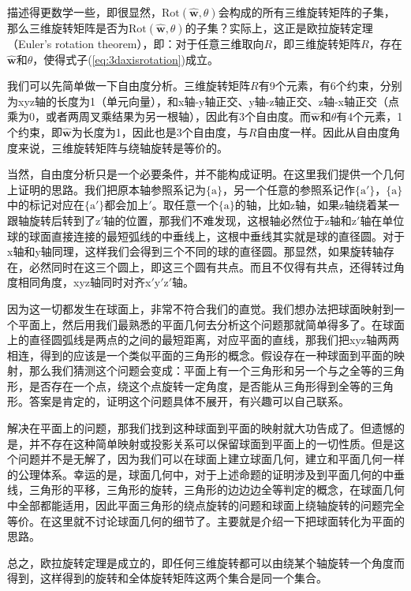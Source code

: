 \documentclass[12pt, a4paper, article, UTF8]{ctexart}
\begin{document}
描述得更数学一些，即很显然，$\text{Rot}(\hat{\mathbf{w}}, \theta)$会构成的所有三维旋转矩阵的子集，那么三维旋转矩阵是否为$\text{Rot}(\hat{\mathbf{w}}, \theta)$的子集？实际上，这正是欧拉旋转定理（Euler's rotation theorem），即：对于任意三维取向$R$，即三维旋转矩阵$R$，存在$\hat{\mathbf{w}}$和$\theta$，使得式子(\ref{eq:3daxisrotation})成立。

我们可以先简单做一下自由度分析。三维旋转矩阵$R$有9个元素，有6个约束，分别为xyz轴的长度为1（单元向量），和x轴-y轴正交、y轴-z轴正交、z轴-x轴正交（点乘为0，或者两周叉乘结果为另一根轴），因此有3个自由度。而$\hat{\mathbf{w}}$和$\theta$有4个元素，1个约束，即$\hat{\mathbf{w}}$为长度为1，因此也是3个自由度，与$R$自由度一样。因此从自由度角度来说，三维旋转矩阵与绕轴旋转是等价的。

当然，自由度分析只是一个必要条件，并不能构成证明。在这里我们提供一个几何上证明的思路。我们把原本轴参照系记为$\{\text{a}\}$，另一个任意的参照系记作$\{\text{a}'\}$，$\{\text{a}\}$中的标记对应在$\{\text{a}'\}$都会加上$'$。取任意一个$\{\text{a}\}$的轴，比如z轴，如果z轴绕着某一跟轴旋转后转到了z$'$轴的位置，那我们不难发现，这根轴必然位于z轴和z$'$轴在单位球的球面直接连接的最短弧线的中垂线上，这根中垂线其实就是球的直径圆。对于x轴和y轴同理，这样我们会得到三个不同的球的直径圆。那显然，如果旋转轴存在，必然同时在这三个圆上，即这三个圆有共点。而且不仅得有共点，还得转过角度相同角度，xyz轴同时对齐x$'$y$'$z$'$轴。

因为这一切都发生在球面上，非常不符合我们的直觉。我们想办法把球面映射到一个平面上，然后用我们最熟悉的平面几何去分析这个问题那就简单得多了。在球面上的直径圆弧线是两点的之间的最短距离，对应平面的直线，那我们把xyz轴两两相连，得到的应该是一个类似平面的三角形的概念。假设存在一种球面到平面的映射，那么我们猜测这个问题会变成：平面上有一个三角形和另一个与之全等的三角形，是否存在一个点，绕这个点旋转一定角度，是否能从三角形得到全等的三角形。答案是肯定的，证明这个问题具体不展开，有兴趣可以自己联系。

解决在平面上的问题，那我们找到这种球面到平面的映射就大功告成了。但遗憾的是，并不存在这种简单映射或投影关系可以保留球面到平面上的一切性质。但是这个问题并不是无解了，因为我们可以在球面上建立球面几何，建立和平面几何一样的公理体系。幸运的是，球面几何中，对于上述命题的证明涉及到平面几何的中垂线，三角形的平移，三角形的旋转，三角形的边边边全等判定的概念，在球面几何中全部都能适用，因此平面三角形的绕点旋转的问题和球面上绕轴旋转的问题完全等价。在这里就不讨论球面几何的细节了。主要就是介绍一下把球面转化为平面的思路。

总之，欧拉旋转定理是成立的，即任何三维旋转都可以由绕某个轴旋转一个角度而得到，这样得到的旋转和全体旋转矩阵这两个集合是同一个集合。
\end{document}
